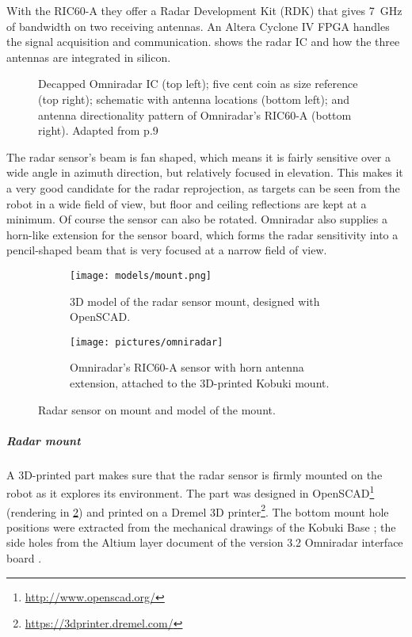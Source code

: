 With the RIC60-A they offer a Radar Development Kit (RDK) that gives
\SI{7}{GHz} of bandwidth on two receiving antennas. An Altera Cyclone IV FPGA
handles the signal acquisition and communication.  shows the
radar IC and how the three antennas are integrated in silicon.

\begin{figure}[htbp]
    \centering
    \def\svgwidth{12cm}
    
    \caption{Decapped Omniradar IC (top left); five cent coin as size reference (top right); schematic with antenna locations (bottom left); and antenna directionality pattern of Omniradar's RIC60-A (bottom right). Adapted from \cite{Brouwer2015} p.9}
    \label{fig:slide_RIC60A}
\end{figure}

The radar sensor's beam is fan shaped, which means it is fairly
sensitive over a wide angle in azimuth direction, but relatively focused
in elevation. This makes it a very good candidate for the radar
reprojection, as targets can be seen from the robot in a wide field of
view, but floor and ceiling reflections are kept at a minimum. Of course
the sensor can also be rotated. Omniradar also supplies a horn-like
extension for the sensor board, which forms the radar sensitivity into a
pencil-shaped beam that is very focused at a narrow field of view.

\begin{figure}[htbp]
    \centering
    \begin{subfigure}[t]{0.43793038951\textwidth}
        \centering
        \label{fig:mount}
        \texttt{[image: models/mount.png]}
        \caption{3D model of the radar sensor mount, designed with OpenSCAD.}
    \end{subfigure}
    \hfill
    \begin{subfigure}[t]{0.51206961048\textwidth}
        \label{fig:omniradar}
        \texttt{[image: pictures/omniradar]}
        \caption{Omniradar's RIC60-A sensor with horn antenna extension, attached to the 3D-printed Kobuki mount.}
    \end{subfigure}
    \caption{Radar sensor on mount and model of the mount.}
\end{figure}


\subparagraph{Radar mount}\label{radar-mount}

A 3D-printed part makes sure that the radar sensor is firmly mounted on
the robot as it explores its environment. The part was designed in
OpenSCAD\footnote{\url{http://www.openscad.org/}} (rendering in \cref{fig:mount}) and printed on a
Dremel 3D printer\footnote{\url{https://3dprinter.dremel.com/}}. The bottom
mount hole positions were extracted from the mechanical drawings of the
Kobuki Base \cite{YujinRobot2012}; the side holes from the Altium layer
document of the version 3.2 Omniradar interface board
\cite{Omniradar2014}.

